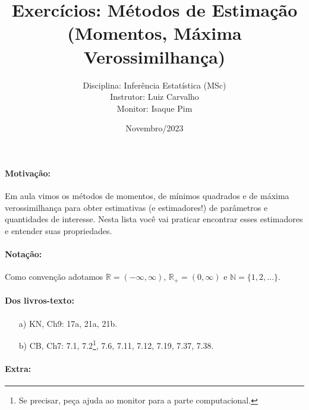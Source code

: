 \documentclass[a4paper,10pt, notitlepage]{report}
\title{Exercícios: Métodos de Estimação (Momentos, Máxima Verossimilhança)}
\author{Disciplina: Inferência Estatística (MSc) \\ Instrutor: Luiz Carvalho \\ Monitor: Isaque Pim}
\date{Novembro/2023}
\newcommand{\rpl}{\mathbb{R}_+}
\begin{document}
\maketitle

\paragraph{Motivação:} Em aula vimos os métodos de momentos, de mínimos quadrados e de máxima verossimilhança para obter estimativas (e estimadores!) de parâmetros e quantidades de interesse. Nesta lista você vai praticar encontrar esses estimadores e entender suas propriedades.

\paragraph{Notação:} Como convenção adotamos $\mathbb{R} = (-\infty, \infty)$, $\rpl = (0, \infty)$ e $\mathbb{N} = \{1, 2, \ldots \}$.

\paragraph{Dos livros-texto:}

\begin{itemize}
    \item[a)] KN, Ch9: 17a, 21a, 21b.
    \item[b)] CB, Ch7: 7.1, 7.2\footnote{Se precisar, peça ajuda ao monitor para a parte computacional.}, 7.6, 7.11, 7.12, 7.19, 7.37, 7.38.
\end{itemize}


\paragraph{Extra:}
\end{document}
